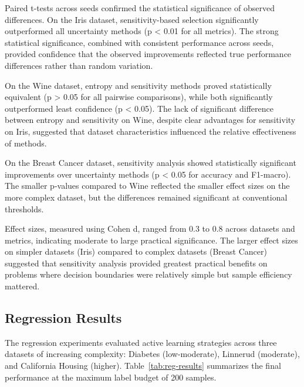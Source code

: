 \documentclass[conference]{IEEEtran}
\begin{document}
Paired t-tests across seeds confirmed the statistical significance of observed differences. On the Iris dataset, sensitivity-based selection significantly outperformed all uncertainty methods (p < 0.01 for all metrics). The strong statistical significance, combined with consistent performance across seeds, provided confidence that the observed improvements reflected true performance differences rather than random variation.

On the Wine dataset, entropy and sensitivity methods proved statistically equivalent (p > 0.05 for all pairwise comparisons), while both significantly outperformed least confidence (p < 0.05). The lack of significant difference between entropy and sensitivity on Wine, despite clear advantages for sensitivity on Iris, suggested that dataset characteristics influenced the relative effectiveness of methods.

On the Breast Cancer dataset, sensitivity analysis showed statistically significant improvements over uncertainty methods (p < 0.05 for accuracy and F1-macro). The smaller p-values compared to Wine reflected the smaller effect sizes on the more complex dataset, but the differences remained significant at conventional thresholds.

Effect sizes, measured using Cohen d, ranged from 0.3 to 0.8 across datasets and metrics, indicating moderate to large practical significance. The larger effect sizes on simpler datasets (Iris) compared to complex datasets (Breast Cancer) suggested that sensitivity analysis provided greatest practical benefits on problems where decision boundaries were relatively simple but sample efficiency mattered.

\subsection{Regression Results}

The regression experiments evaluated active learning strategies across three datasets of increasing complexity: Diabetes (low-moderate), Linnerud (moderate), and California Housing (higher). Table~\ref{tab:reg-results} summarizes the final performance at the maximum label budget of 200 samples.
\end{document}
